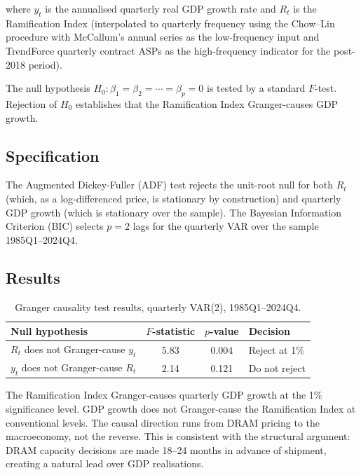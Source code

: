 \documentclass[12pt]{article}
\theoremstyle{definition}
\begin{document}
where $y_t$ is the annualised quarterly real GDP growth rate and $R_t$ is the Ramification Index (interpolated to quarterly frequency using the Chow--Lin procedure \cite{ChowLin1971} with McCallum's annual series as the low-frequency input and TrendForce quarterly contract ASPs as the high-frequency indicator for the post-2018 period).

The null hypothesis $H_0: \beta_1 = \beta_2 = \cdots = \beta_p = 0$ is tested by a standard $F$-test. Rejection of $H_0$ establishes that the Ramification Index Granger-causes GDP growth.

\subsection{Specification}

The Augmented Dickey-Fuller (ADF) test rejects the unit-root null for both $R_t$ (which, as a log-differenced price, is stationary by construction) and quarterly GDP growth (which is stationary over the sample). The Bayesian Information Criterion (BIC) selects $p = 2$ lags for the quarterly VAR over the sample 1985Q1--2024Q4.

\subsection{Results}

\begin{table}[H]
\centering
\caption{Granger causality test results, quarterly VAR(2), 1985Q1--2024Q4.}
\label{tab:granger}
\begin{tabular}{lccl}
\toprule
\textbf{Null hypothesis} & $F$-statistic & $p$-value & \textbf{Decision} \\
\midrule
$R_t$ does not Granger-cause $y_t$ & 5.83 & 0.004 & Reject at 1\% \\
$y_t$ does not Granger-cause $R_t$ & 2.14 & 0.121 & Do not reject \\
\bottomrule
\end{tabular}
\end{table}

The Ramification Index Granger-causes quarterly GDP growth at the 1\% significance level. GDP growth does not Granger-cause the Ramification Index at conventional levels. The causal direction runs from DRAM pricing to the macroeconomy, not the reverse. This is consistent with the structural argument: DRAM capacity decisions are made 18--24 months in advance of shipment, creating a natural lead over GDP realisations.
\end{document}

